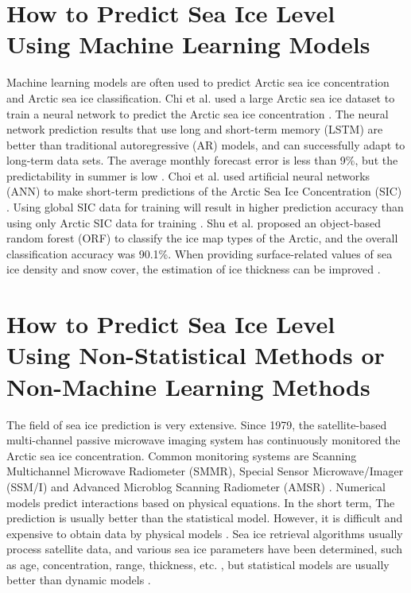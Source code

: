 \section{How to Predict Sea Ice Level Using Machine Learning Models}
Machine learning models are often used to predict Arctic sea ice concentration and Arctic sea ice classification. Chi et al. used a large Arctic sea ice dataset to train a neural network to predict the Arctic sea ice concentration \cite{chi2017prediction}. The neural network prediction results that use long and short-term memory (LSTM) are better than traditional autoregressive (AR) models, and can successfully adapt to long-term data sets. The average monthly forecast error is less than 9\%, but the predictability in summer is low \cite{chi2017prediction}. Choi et al. used artificial neural networks (ANN) to make short-term predictions of the Arctic Sea Ice Concentration (SIC) \cite{choi2019artificial}. Using global SIC data for training will result in higher prediction accuracy than using only Arctic SIC data for training \cite{choi2019artificial}. Shu et al. proposed an object-based random forest (ORF) to classify the ice map types of the Arctic, and the overall classification accuracy was 90.1\%. When providing surface-related values of sea ice density and snow cover, the estimation of ice thickness can be improved \cite{shu2020discrimination}.


\section{How to Predict Sea Ice Level Using Non-Statistical Methods or Non-Machine Learning Methods}
The field of sea ice prediction is very extensive. Since 1979, the satellite-based multi-channel passive microwave imaging system has continuously monitored the Arctic sea ice concentration. Common monitoring systems are Scanning Multichannel Microwave Radiometer (SMMR), Special Sensor Microwave/Imager (SSM/I) and Advanced Microblog Scanning Radiometer (AMSR) \cite{fennig2020fundamental}. Numerical models predict interactions based on physical equations. In the short term, The prediction is usually better than the statistical model. However, it is difficult and expensive to obtain data by physical models \cite{chi2017prediction}. Sea ice retrieval algorithms usually process satellite data, and various sea ice parameters have been determined, such as age, concentration, range, thickness, etc. \cite{chi2017prediction}, but statistical models are usually better than dynamic models \cite{tivy2011origins}.